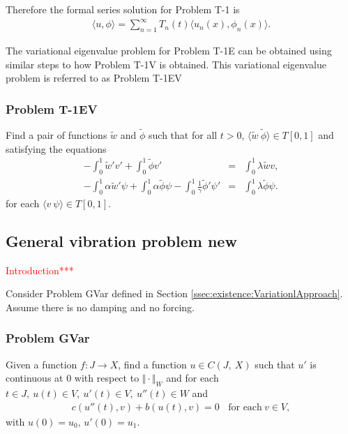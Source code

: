 \documentclass[../../main.tex]{subfiles}
\begin{document}
Therefore the formal series solution for Problem T-1 is
\begin{eqnarray*}
	\langle u, \phi \rangle = \sum_{n=1}^{\infty} T_n(t)\langle u_n(x), \phi_n(x)\rangle.
\end{eqnarray*}





The variational eigenvalue problem for Problem T-1E can be obtained using similar steps to how Problem T-1V is obtained. This variational eigenvalue problem is referred to as Problem T-1EV

\subsubsection*{Problem T-1EV}\label{sssec:1D_Model:ProblemT1EV}
Find a pair of functions $\tilde{w}$ and $\tilde{\phi}$ such that for all $t >0$, $\langle \tilde{w}\ \tilde{\phi}\rangle \in  T[0,1]$ and satisfying the equations
\begin{eqnarray*}
	 -\int_0^1 \tilde{w}'v'  + \int_0^1 \tilde{\phi} v' &=& \int_0^1 \lambda \tilde{w} v ,\\
	 -\int_0^1\alpha \tilde{w}' \psi + \int_0^1\alpha \tilde{\phi} \psi - \int_0^1\frac{1}{\gamma}\tilde{\phi}' \psi' &=& \int_0^1 \lambda \tilde{\phi} \psi .
\end{eqnarray*} for each $\langle v \ \psi\rangle \in T[0,1]$.

\subsection{General vibration problem new}
\textcolor{red}{Introduction***}

Consider Problem GVar defined in Section \ref{ssec:existence:VariationlApproach}. Assume there is no damping and no forcing.

\subsubsection*{Problem GVar}\label{sssec:existence:ProblemGVar}
Given a function $f:J\rightarrow X$, find a function $u\in C(J,\ X)$ such that $u'$ is continuous at $0$ with respect to $\Vert \cdot \Vert_{W}$ and for each $t\in J,\ u(t)\in V,\ u'(t) \in V,\ u''(t)\in W$ and
\begin{eqnarray}
	c(u''(t),v)+b(u(t),v) = 0 \ \ \ \ \textrm{for each} \ v \in V, \label{eq:existence:ProblemGVarHom}
\end{eqnarray}
with $u(0)=u_{0}$, $u'(0)=u_{1}$.\\
\end{document}
